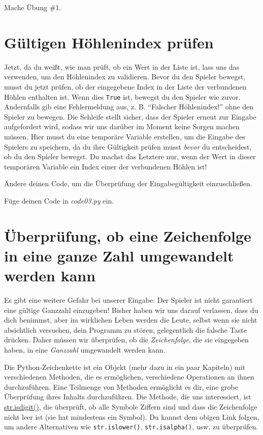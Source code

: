 \documentclass[
]{book}
\begin{document}
Mache Übung \#1.

\hypertarget{guxfcltigen-huxf6hlenindex-pruxfcfen}{%
\section{Gültigen Höhlenindex prüfen}\label{guxfcltigen-huxf6hlenindex-pruxfcfen}}

Jetzt, da du weißt, wie man prüft, ob ein Wert in der Liste ist, lass uns das verwenden, um den Höhlenindex zu validieren. Bevor du den Spieler bewegst, musst du jetzt prüfen, ob der eingegebene Index in der Liste der verbundenen Höhlen enthalten ist. Wenn dies \texttt{True} ist, bewegst du den Spieler wie zuvor. Andernfalls gib eine Fehlermeldung aus, z. B. ``Falscher Höhlenindex!'' ohne den Spieler zu bewegen. Die Schleife stellt sicher, dass der Spieler erneut zur Eingabe aufgefordert wird, sodass wir uns darüber im Moment keine Sorgen machen müssen. Hier musst du eine temporäre Variable erstellen, um die Eingabe des Spielers zu speichern, da du ihre Gültigkeit prüfen musst \emph{bevor} du entscheidest, ob du den Spieler bewegst. Du machst das Letztere nur, wenn der Wert in dieser temporären Variable ein Index einer der verbundenen Höhlen ist!

Ändere deinen Code, um die Überprüfung der Eingabegültigkeit einzuschließen.

Füge deinen Code in \emph{code03.py} ein.

\hypertarget{uxfcberpruxfcfung-ob-eine-zeichenfolge-in-eine-ganze-zahl-umgewandelt-werden-kann}{%
\section{Überprüfung, ob eine Zeichenfolge in eine ganze Zahl umgewandelt werden kann}\label{uxfcberpruxfcfung-ob-eine-zeichenfolge-in-eine-ganze-zahl-umgewandelt-werden-kann}}

Es gibt eine weitere Gefahr bei unserer Eingabe: Der Spieler ist nicht garantiert eine gültige Ganzzahl einzugeben! Bisher haben wir uns darauf verlassen, dass du dich benimmst, aber im wirklichen Leben werden die Leute, selbst wenn sie nicht absichtlich versuchen, dein Programm zu stören, gelegentlich die falsche Taste drücken. Daher müssen wir überprüfen, ob die \emph{Zeichenfolge}, die sie eingegeben haben, in eine \emph{Ganzzahl} umgewandelt werden kann.

Die Python-Zeichenkette ist ein Objekt (mehr dazu in ein paar Kapiteln) mit verschiedenen Methoden, die es ermöglichen, verschiedene Operationen an ihnen durchzuführen. Eine Teilmenge von Methoden ermöglicht es dir, eine grobe Überprüfung ihres Inhalts durchzuführen. Die Methode, die uns interessiert, ist \href{https://docs.python.org/3/library/stdtypes.html\#str.isdigit}{str.isdigit()}, die überprüft, ob alle Symbole Ziffern sind und dass die Zeichenfolge nicht leer ist (sie hat mindestens ein Symbol). Du kannst dem obigen Link folgen, um andere Alternativen wie \texttt{str.islower()}, \texttt{str.isalpha()}, usw. zu überprüfen.
\end{document}
